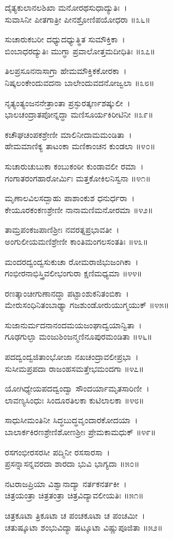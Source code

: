 	ದೈತ್ಯಕುಲಾನಲಶಿಖಾ ಮನೋರಥಸುಧಾದ್ಯುತಿಃ~।\\
	ಸುವಾಸಿನೀ ಪೀತಗಾತ್ರೀ ಪೀನಶ್ರೋಣಿಪಯೋಧರಾ ॥೩೬॥

ಸುಚಾರುಕಬರೀ ದಧ್ಯುದಧ್ಯುತ್ಥಿತ ಸುಮೌಕ್ತಿಕಾ~।\\
ಬಿಂಬಾಧರದ್ಯುತಿಃ ಮುಗ್ಧಾ ಪ್ರವಾಲೋತ್ತಮದೀಧಿತಿಃ ॥೩೭॥

	ತಿಲಪ್ರಸೂನನಾಸಾಗ್ರಾ ಹೇಮಮೌಕ್ತಿಕಕೋರಕಾ~।\\
	ನಿಷ್ಕಲಂಕೇಂದುವದನಾ ಬಾಲೇಂದುವದನೋಜ್ವಲಾ ॥೩೮॥

ನೃತ್ಯಂತ್ಯಂಜನನೇತ್ರಾಂತಾ ಪ್ರಸ್ಫುರತ್ಕರ್ಣಶಷ್ಕುಲೀ~।\\
ಭಾಲಚಂದ್ರಾತಪೋನ್ನದ್ಧಾ ಮಣಿಸೂರ್ಯಕಿರೀಟಿನೀ ॥೩೯॥

	ಕಚೌಘಚಂಪಕಶ್ರೇಣೀ ಮಾಲಿನೀದಾಮಮಂಡಿತಾ~।\\
	ಹೇಮಮಾಣಿಕ್ಯ ತಾಟಂಕಾ ಮಣಿಕಾಂಚನ ಕುಂಡಲಾ ॥೪೦॥

ಸುಚಾರುಚುಬುಕಾ ಕಂಬುಕಂಠೀ ಕುಂಡಾವಲೀ ರಮಾ~।\\
ಗಂಗಾತರಂಗಹಾರೋರ್ಮಿಃ ಮತ್ತಕೋಕಿಲನಿಸ್ವನಾ ॥೪೧॥

	ಮೃಣಾಲವಿಲಸದ್ಬಾಹು ಪಾಶಾಂಕುಶ ಧನುರ್ಧರಾ~।\\
	ಕೇಯೂರಕಂಕಣಶ್ರೇಣೀ ನಾನಾಮಣಿಮನೋರಮಾ ॥೪೨॥

ತಾಮ್ರಪಂಕಜಪಾಣಿಶ್ರೀಃ ನವರತ್ನಪ್ರಭಾವತೀ~।\\
ಅಂಗುಲೀಯಮಣಿಶ್ರೇಣೀ ಕಾಂತಿಮಂಗಲಸಂತತಿಃ ॥೪೩॥

	ಮಂದರದ್ವಂದ್ವಸುಕುಚಾ ರೋಮರಾಜಿಭುಜಂಗಿಕಾ~।\\
	ಗಂಭೀರನಾಭಿಸ್ತ್ರಿವಲೀಭಂಗುರಾ ಕ್ಷಣಿಮಧ್ಯಮಾ ॥೪೪॥

ರಣತ್ಕಾಂಚೀಗುಣಾನದ್ಧಾ ಪಟ್ಟಾಂಶುಕನಿತಂಬಿಕಾ~।\\
ಮೇರುಸಂಧಿನಿತಂಬಾಢ್ಯಾ ಗಜಶುಂಡೋರುಯುಗ್ಮಯುಕ್ ॥೪೫॥

	ಸುಜಾನುರ್ಮದನಾನಂದಮಯಜಂಘಾದ್ವಯಾನ್ವಿತಾ~।\\
	ಗೂಢಗುಲ್ಫಾ ಮಂಜುಶಿಂಜನ್ಮಣಿನೂಪುರಮಂಡಿತಾ ॥೪೬॥

ಪದದ್ವಂದ್ವಜಿತಾಂಭೋಜಾ ನಖಚಂದ್ರಾವಲೀಪ್ರಭಾ~।\\
ಸುಸೀಮಪ್ರಪದಾ ರಾಜಂಹಸಮತ್ತೇಭಮಂದಗಾ ॥೪೭॥

	ಯೋಗಿಧ್ಯೇಯಪದದ್ವಂದ್ವಾ ಸೌಂದರ್ಯಾಮೃತಸಾರಿಣೀ~।\\
	ಲಾವಣ್ಯಸಿಂಧುಃ ಸಿಂದೂರತಿಲಕಾ ಕುಟಿಲಾಲಕಾ ॥೪೮॥

ಸಾಧುಸೀಮಂತಿನೀ ಸಿದ್ಧಬುದ್ಧವೃಂದಾರಕೋದಯಾ~।\\
ಬಾಲಾರ್ಕಕಿರಣಶ್ರೇಣಿಶೋಣಶ್ರೀಃ ಪ್ರೇಮಕಾಮಧುಕ್ ॥೪೯॥

	ರಸಗಂಭೀರಸರಸೀ ಪದ್ಮಿನೀ ರಸಸಾರಸಾ~।\\
	ಪ್ರಸನ್ನಾಸನ್ನವರದಾ ಶಾರದಾ ಭುವಿ ಭಾಗ್ಯದಾ ॥೫೦॥

ನಟರಾಜಪ್ರಿಯಾ ವಿಶ್ವಾನಾದ್ಯಾ ನರ್ತಕನರ್ತಕೀ~।\\
ಚಿತ್ರಯಂತ್ರಾ ಚಿತ್ರತಂತ್ರಾ ಚಿತ್ರವಿದ್ಯಾವಲೀಯತಿಃ ॥೫೧॥

	ಚಿತ್ರಕೂಟಾ ತ್ರಿಕೂಟಾ ಚ ಪಂಚಕೂಟಾ ಚ ಪಂಚಮೀ~।\\
	ಚತುಷ್ಕೂಟಾ ಶಂಭುವಿದ್ಯಾ ಷಟ್ಕೂಟಾ ವಿಷ್ಣುಪೂಜಿತಾ ॥೫೨॥

